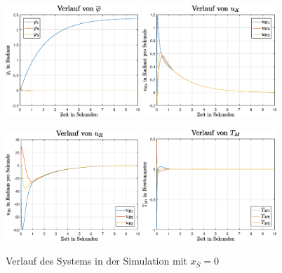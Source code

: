 \begin{figure}[!ht]
\centering
\includegraphics[width=0.45\textwidth]{img/lin_sim1_phi.eps}\hspace{1cm}
\includegraphics[width=0.45\textwidth]{img/lin_sim1_uk.eps}
\end{figure}
\begin{figure}[!ht]\ContinuedFloat
\centering
\includegraphics[width=0.45\textwidth]{img/lin_sim1_ur.eps}\hspace{1cm}
\includegraphics[width=0.45\textwidth]{img/lin_sim1_tm.eps}
\caption{Verlauf des Systems in der Simulation mit $x_{\overline{S}}=0$}
\end{figure}
